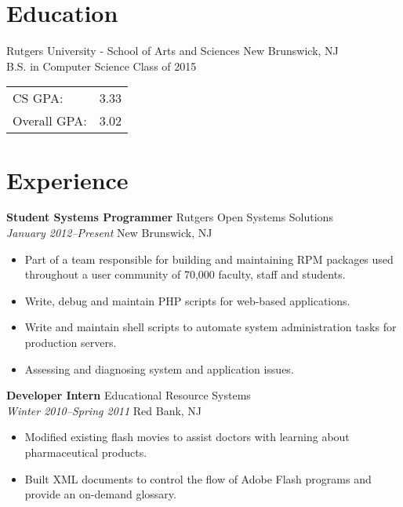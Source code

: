 \documentclass[centered,overlapped]{res}
\begin{document}

\address{153 Riveredge Road \\ Tinton Falls, NJ 07724}
\address{josh@jmatthews.us \\ github.com/jmatth}

\begin{resume}


\section{Education}

Rutgers University - School of Arts and Sciences \hfill New Brunswick, NJ\\
B.S. in Computer Science \hfill Class of 2015 \\
\begin{tabular}{l l}
	CS GPA: & 3.33 \\
	Overall GPA: & 3.02 \\
\end{tabular}

\section{Experience}

{\bf Student Systems Programmer} \hfill Rutgers Open Systems Solutions\\
\textit{January 2012--Present} \hfill New Brunswick, NJ
\begin{itemize} \itemsep -2pt %
	\item Part of a team responsible for building and maintaining RPM packages used throughout a user community of 70,000 faculty, staff and students.
	\item Write, debug and maintain PHP scripts for web-based applications.
	\item Write and maintain shell scripts to automate system administration tasks for production servers.
	\item Assessing and diagnosing system and application issues.
\end{itemize}

{\bf Developer Intern} \hfill Educational Resource Systems\\
\textit{Winter 2010--Spring 2011} \hfill  Red Bank, NJ
\begin{itemize} \itemsep -2pt %
	\item Modified existing flash movies to assist doctors with learning about pharmaceutical products.
	\item Built XML documents to control the flow of Adobe Flash programs and provide an on-demand glossary.
\end{itemize}


\end{resume}
\end{document}
